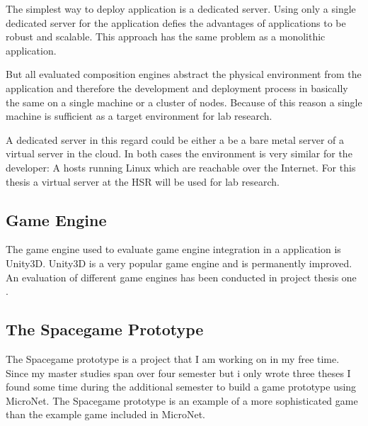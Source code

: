 The simplest way to deploy \ms{} application is a dedicated server. Using only a
single dedicated server for the application defies the advantages of \ms{}
applications to be robust and scalable. This approach has the same problem as a
monolithic application.

But all evaluated composition engines abstract the physical environment from the
application and therefore the development and deployment process in basically
the same on a single machine or a cluster of nodes. Because of this reason a
single machine is sufficient as a target environment for lab research.

A dedicated server in this regard could be either a be a bare metal server of a
virtual server in the cloud. In both cases the environment is very similar for
the developer: A hosts running Linux which are reachable over the
Internet. For this thesis a virtual server at the HSR will be used for lab research.

\subsection{Game Engine}

The game engine used to evaluate game engine integration in a \ms{} application
is Unity3D. Unity3D is a very popular game engine and is permanently improved.
An evaluation of different game engines has been conducted in project thesis one
.

\subsection{The Spacegame Prototype}

The Spacegame prototype is a project that I am working on in my free time. Since
my master studies span over four semester but i only wrote three theses I found
some time during the additional semester to build a game prototype using
MicroNet. The Spacegame prototype is an example of a more sophisticated game
than the example game included in MicroNet.

